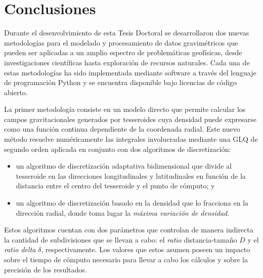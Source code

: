 \chapter{Conclusiones}

Durante el desenvolvimiento de esta Tesis Doctoral se desarrollaron dos nuevas
metodologías para el modelado y procesamiento de datos gravimétricos que pueden
ser aplicadas a un amplio espectro de problemáticas geofísicas,
desde investigaciones científicas hasta exploración de recursos
naturales.
Cada una de estas metodologías ha sido implementada mediante software a través
del lenguaje de programación Python y se encuentra disponible bajo licencias
de código abierto.

\vspace{1em}

La primer metodología consiste en un modelo directo que permite calcular los
campos gravitacionales generados por tesseroides cuya densidad puede expresarse
como una función continua dependiente de la coordenada radial.
Este nuevo método resuelve numéricamente las integrales involucradas mediante
una \acl{GLQ} de segundo orden aplicada en conjunto con dos algoritmos de
discretización:

\begin{itemize}
    \item un algoritmo de discretización adaptativa bidimensional que divide al
        tesseroide en las direcciones longitudinales y latitudinales en función
        de la distancia entre el centro del tesseroide y el punto de cómputo; y
    \item  un algoritmo de discretización basado en la densidad que lo
        fracciona en la dirección radial, donde toma lugar la \emph{máxima
        variación de densidad}.
\end{itemize}

Estos algoritmos cuentan con dos parámetros que controlan de manera indirecta
la cantidad de subdivisiones que se llevan a cabo: el \emph{ratio}
distancia-tamaño $D$ y el \emph{ratio delta} $\delta$, respectivamente.
Los valores que estos asumen poseen un impacto sobre el tiempo de cómputo
necesario para llevar a cabo los cálculos y sobre la precisión de los
resultados.

